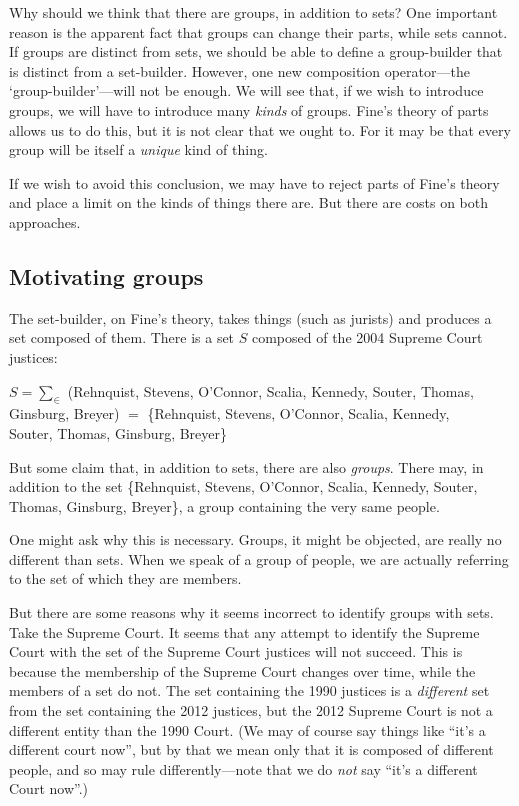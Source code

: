 \documentclass[11pt]{article}
\newenvironment{squote}{%
\begin{spacing}{1}
\begin{list}{}{%
\setlength{\labelwidth}{0pt}%
\rightmargin\leftmargin%
}
\item\relax
}{%
\end{list}%
\end{spacing}
}
\begin{document}
\begin{spacing}{1.5}
Why should we think that there are groups, in addition to sets?  One
important reason is the apparent fact that groups can change their
parts, while sets cannot.  If groups are distinct from sets, we should
be able to define a group-builder that is distinct from a set-builder.
However, one new composition operator---the `group-builder'---will not
be enough.  We will see that, if we wish to introduce groups, we will
have to introduce many {\em kinds} of groups.  Fine's theory of parts
allows us to do this, but it is not clear that we ought to.  For it
may be that every group will be itself a {\em unique} kind of thing.

If we wish to avoid this conclusion, we may have to reject parts of
Fine's theory and place a limit on the kinds of things there are.  But
there are costs on both approaches.

\subsection{Motivating groups}
The set-builder, on Fine's theory, takes things (such as jurists) and
produces a set composed of them.  There is a set $S$ composed of the
2004 Supreme Court justices:

\begin{squote}
$S = \sum _{\in}$ (Rehnquist, Stevens, O'Connor, Scalia, Kennedy,
  Souter, Thomas, \\ Ginsburg, Breyer) $ = $ \{Rehnquist, Stevens,
  O'Connor, Scalia, Kennedy, \\ Souter, Thomas, Ginsburg, Breyer\}
\end{squote}

But some claim that, in addition to sets, there are also {\em groups}.
There may, in addition to the set \{Rehnquist, Stevens, O'Connor,
Scalia, Kennedy, Souter, Thomas, Ginsburg, Breyer\}, a group
containing the very same people.

One might ask why this is necessary.  Groups, it might be objected,
are really no different than sets.  When we speak of a group of
people, we are actually referring to the set of which they are
members.

But there are some reasons why it seems incorrect to identify groups
with sets.  Take the Supreme Court.  It seems that any attempt to
identify the Supreme Court with the set of the Supreme Court justices
will not succeed.  This is because the membership of the Supreme Court
changes over time, while the members of a set do not.  The set
containing the 1990 justices is a {\em different} set from the set
containing the 2012 justices, but the 2012 Supreme Court is not a
different entity than the 1990 Court.  (We may of course say things
like ``it's a different court now'', but by that we mean only that it
is composed of different people, and so may rule differently---note
that we do {\em not} say ``it's a different Court now''.)


\end{spacing}
\end{document}
